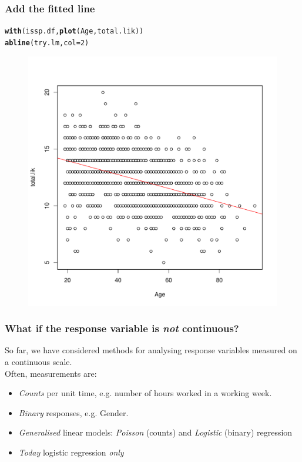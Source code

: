 \documentclass{beamer}\usepackage[]{graphicx}\usepackage[]{color}
\makeatletter
\newcommand{\hlnum}[1]{\textcolor[rgb]{0.686,0.059,0.569}{#1}}%
\newcommand{\hlstd}[1]{\textcolor[rgb]{0.345,0.345,0.345}{#1}}%
\newcommand{\hlkwc}[1]{\textcolor[rgb]{0.333,0.667,0.333}{#1}}%
\newcommand{\hlkwd}[1]{\textcolor[rgb]{0.737,0.353,0.396}{\textbf{#1}}}%
\newenvironment{kframe}{%
 \def\at@end@of@kframe{}%
 \ifinner\ifhmode%
  \def\at@end@of@kframe{\end{minipage}}%
  \begin{minipage}{\columnwidth}%
 \fi\fi%
 \def\FrameCommand##1{\hskip\@totalleftmargin \hskip-\fboxsep
 \colorbox{shadecolor}{##1}\hskip-\fboxsep
     \hskip-\linewidth \hskip-\@totalleftmargin \hskip\columnwidth}%
 \MakeFramed {\advance\hsize-\width
   \@totalleftmargin\z@ \linewidth\hsize
   \@setminipage}}%
 {\par\unskip\endMakeFramed%
 \at@end@of@kframe}
\newenvironment{knitrout}{}{} %
\makeatother
\begin{document}
\begin{frame}[fragile]
  \frametitle{Add the fitted line}
\begin{knitrout}
\color{fgcolor}\begin{kframe}
\begin{alltt}
\hlkwd{with}\hlstd{(issp.df,} \hlkwd{plot}\hlstd{(Age, total.lik))}
\hlkwd{abline}\hlstd{(try.lm,} \hlkwc{col} \hlstd{=} \hlnum{2}\hlstd{)}
\end{alltt}
\end{kframe}
\end{knitrout}

\begin{figure}[h]
  \vspace{-20pt}
  \centering
  \includegraphics[height = 0.6\textwidth, keepaspectratio]{Figure/fitted}
  \label{fig:fitted}
\end{figure}
\end{frame} 

\begin{frame}[fragile]
\frametitle{What if the response variable is \emph{not} continuous?}
So far, we have considered methods for analysing response variables 
measured on a continuous scale.\\
\vspace{0.2cm}
Often, measurements are:
  \begin{itemize}
\item \emph{Counts} per unit time, e.g. number of hours worked in a working week.
\item \emph{Binary} responses, e.g. Gender.
\item \emph{Generalised} linear models: \emph{Poisson} (counts) and \emph{Logistic} (binary) regression
\item \emph{Today} logistic regression \emph{only}
\end{itemize}
\end{frame}
\end{document}
